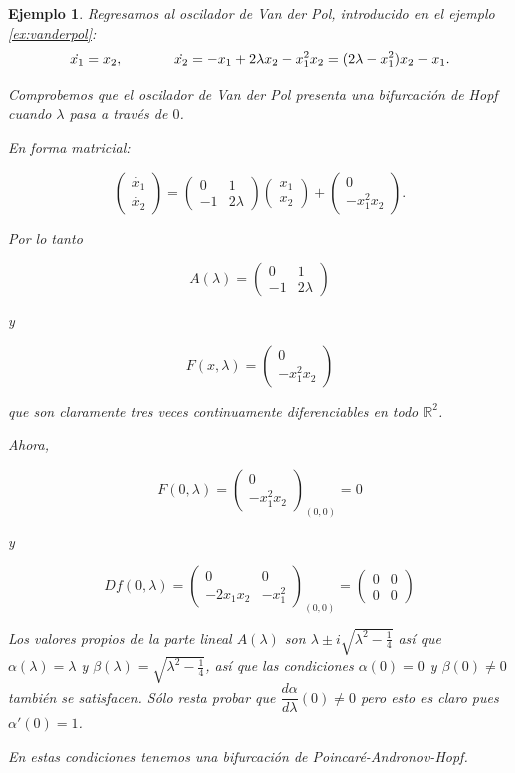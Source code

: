 \documentclass[11pt]{book}
\theoremstyle{definition}
\numberwithin{definition}{section}
\theoremstyle{theorem}
\numberwithin{theorem}{section}
\numberwithin{lemma}{section}
\numberwithin{corollary}{section}
\theoremstyle{plain}
\newtheorem{example}{Ejemplo}
\numberwithin{example}{section}
\newcommand{\R}{{\ensuremath{\mathbb{R}}}}
\begin{document}
\begin{example} \label{ex:vanderpol-hopf}
Regresamos al oscilador de Van der Pol, introducido en el ejemplo \ref{ex:vanderpol}:
$$
	\dot{x_1} = x_2, \hspace{0.5in} \dot{x_2} = -x_1 + 2\lambda x_2 - x_1^2 x_2 = (2\lambda - x_1^2)x_2 - x_1.
$$

Comprobemos que el oscilador de Van der Pol presenta una bifurcación de Hopf cuando $\lambda$ pasa a través de $0$.

En forma matricial:

$$
	\begin{pmatrix}\dot{x_1} \\ \dot{x_2}\end{pmatrix} =	\begin{pmatrix}0 & 1 \\ -1 & 2\lambda \end{pmatrix} \begin{pmatrix}x_1 \\ x_2 \end{pmatrix} + \begin{pmatrix} 0 \\ -x_1^2 x_2\end{pmatrix}.
$$

Por lo tanto

$$
	A(\lambda) = \begin{pmatrix}0 & 1 \\ -1 & 2\lambda \end{pmatrix}
$$

y

$$
	F(x, \lambda) = \begin{pmatrix} 0 \\ -x_1^2 x_2\end{pmatrix}
$$

que son claramente tres veces continuamente diferenciables en todo $\R^2$.

Ahora,

$$F(0, \lambda) = \begin{pmatrix}0 \\ -x_1^2x_2\end{pmatrix}_{(0,0)} = 0 $$

y

$$ Df(0, \lambda) = \begin{pmatrix} 0 & 0 \\ -2x_1x_2 & -x_1^2 \end{pmatrix}_{(0,0)} = \begin{pmatrix}0 & 0 \\ 0 & 0\end{pmatrix}$$

Los valores propios de la parte lineal $A(\lambda)$ son $\lambda \pm i\sqrt{\lambda^2 - \frac{1}{4}}$ así que $\alpha(\lambda) = \lambda$ y $\beta(\lambda) = \sqrt{\lambda^2 - \frac{1}{4}}$, así que las condiciones $\alpha(0) = 0$ y $\beta(0) \neq 0$ también se satisfacen. Sólo resta probar que $\dfrac{d \alpha}{d \lambda}(0) \neq 0$ pero esto es claro pues $\alpha'(0) = 1$.

En estas condiciones tenemos una bifurcación de Poincaré-Andronov-Hopf.
\end{example}
\end{document}
